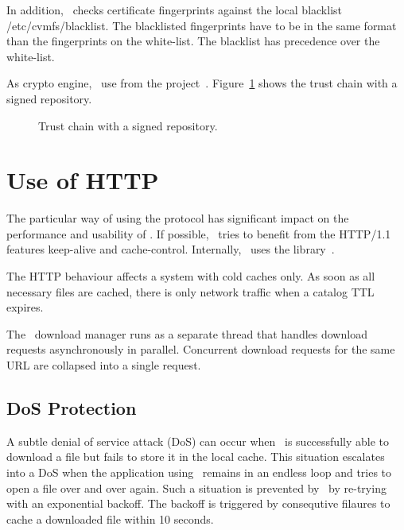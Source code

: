 In addition, \cvmfs\ checks certificate fingerprints against the local blacklist /etc/cvmfs/blacklist.
The blacklisted fingerprints have to be in the same format than the fingerprints on the white-list.
The blacklist has precedence over the white-list.

As crypto engine, \cvmfs\ use  from the  project~\cite{openssl}.
Figure~\ref{fig:security} shows the trust chain with a signed repository.
\begin{figure}
	\begin{center}
		
	\end{center}
	\caption{Trust chain with a signed repository.}
	\label{fig:security}
\end{figure}



\pagebreak
\section{Use of HTTP}
The particular way of using the  protocol has significant impact on the performance and usability of \cvmfs.
If possible, \cvmfs\ tries to benefit from the HTTP/1.1 features keep-alive and cache-control.
Internally, \cvmfs\ uses the  library~\cite{libcurl}.

The HTTP behaviour affects a system with cold caches only.
As soon as all necessary files are cached, there is only network traffic when a catalog TTL expires.

The \cvmfs\ download manager runs as a separate thread that handles download requests asynchronously in parallel.
Concurrent download requests for the same URL are collapsed into a single request.

\subsection{DoS Protection}
A subtle denial of service attack (DoS) can occur when \cvmfs\ is successfully able to download a file but fails to store it in the local cache.
This situation escalates into a DoS when the application using \cvmfs\ remains in an endless loop and tries to open a file over and over again.
Such a situation is prevented by \cvmfs\ by re-trying with an exponential backoff.
The backoff is triggered by consequtive filaures to cache a downloaded file within 10 seconds.

